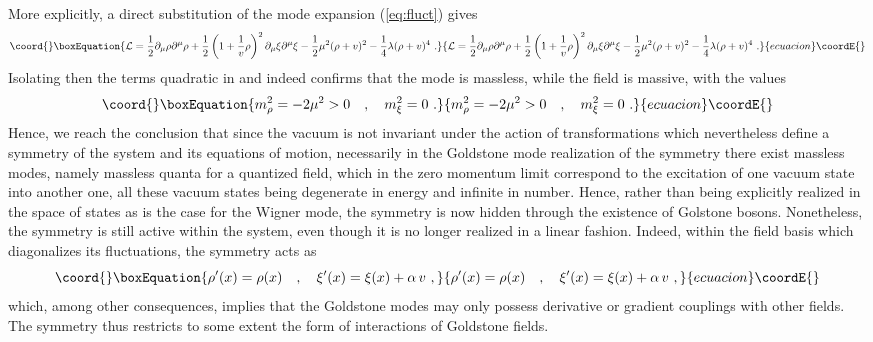 \documentclass[a4paper,11pt]{article}
\begin{document}
More explicitly, a direct substitution of the mode expansion (\ref{eq:fluct})
gives
\begin{equation}\coord{}\boxEquation{
{\cal L}=\frac{1}{2}\partial_\mu\rho\partial^\mu\rho+
\frac{1}{2}\left(1+\frac{1}{v}\rho\right)^2\partial_\mu\xi\partial^\mu\xi
-\frac{1}{2}\mu^2(\rho+v)^2-\frac{1}{4}\lambda(\rho+v)^4\ .
}{
{\cal L}=\frac{1}{2}\partial_\mu\rho\partial^\mu\rho+
\frac{1}{2}\left(1+\frac{1}{v}\rho\right)^2\partial_\mu\xi\partial^\mu\xi
-\frac{1}{2}\mu^2(\rho+v)^2-\frac{1}{4}\lambda(\rho+v)^4\ .
}{ecuacion}\coordE{}\end{equation}
Isolating then the terms quadratic in \coordHE{} and \coordHE{} indeed confirms
that the mode \coordHE{} is massless, while the \coordHE{} field is massive, 
with the values
\begin{equation}\coord{}\boxEquation{
m^2_\rho=-2\mu^2>0\ \ \ ,\ \ \ 
m^2_\xi=0\ .
}{
m^2_\rho=-2\mu^2>0\ \ \ ,\ \ \ 
m^2_\xi=0\ .
}{ecuacion}\coordE{}\end{equation}
Hence, we reach the conclusion that since the vacuum is not invariant
under the action of transformations which nevertheless define a symmetry
of the system and its equations of motion, necessarily in the Goldstone
mode rea\-li\-zation of the symmetry there exist massless modes, namely 
massless quanta for a quantized field, which in the zero momentum limit 
correspond to the excitation of one vacuum state into another one, all 
these vacuum states being degenerate in energy and infinite in number. 
Hence, rather than being explicitly realized in the space of states as is 
the case for the Wigner mode, the symmetry is now hidden through the 
existence of Golstone bosons. Nonetheless, the symmetry is still active 
within the system, even though it is no longer realized in a linear fashion. 
Indeed, within the field basis which diagonalizes its fluctuations, 
the symmetry acts as
\begin{equation}\coord{}\boxEquation{
\rho'(x)=\rho(x)\ \ \ ,\ \ \ \xi'(x)=\xi(x)+\alpha\,v\ ,
}{
\rho'(x)=\rho(x)\ \ \ ,\ \ \ \xi'(x)=\xi(x)+\alpha\,v\ ,
}{ecuacion}\coordE{}\end{equation}
which, among other consequences, implies that the Goldstone modes may
only possess derivative or gradient couplings with other fields.
The symmetry thus restricts to some extent the form of interactions
of Goldstone fields.
\end{document}
